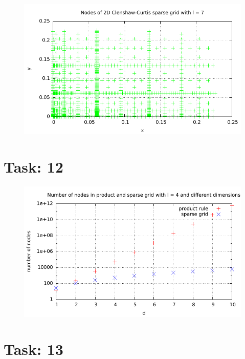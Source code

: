 \documentclass{article}
\begin{document}
\begin{figure}[htbp]
  \centering
     \includegraphics[width=1.0\textwidth]{../Task11/sh3_task11_point_plot_clenshawCurtis_l=7.pdf}
\end{figure}

\section*{Task: 12}

\begin{figure}[htbp]
  \centering
     \includegraphics[width=1.0\textwidth]{../Task12/sh3_task12_num_of_nodes.pdf}
\end{figure}

\section*{Task: 13}
\end{document}
